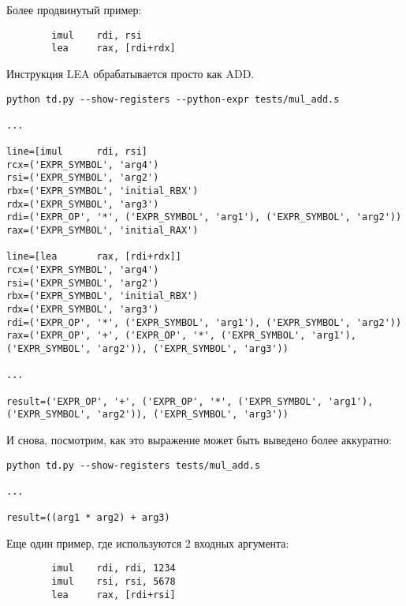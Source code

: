 Более продвинутый пример:

\begin{lstlisting}
        imul    rdi, rsi
        lea     rax, [rdi+rdx]
\end{lstlisting}

Инструкция LEA обрабатывается просто как ADD.

\begin{lstlisting}
python td.py --show-registers --python-expr tests/mul_add.s

...

line=[imul      rdi, rsi]
rcx=('EXPR_SYMBOL', 'arg4')
rsi=('EXPR_SYMBOL', 'arg2')
rbx=('EXPR_SYMBOL', 'initial_RBX')
rdx=('EXPR_SYMBOL', 'arg3')
rdi=('EXPR_OP', '*', ('EXPR_SYMBOL', 'arg1'), ('EXPR_SYMBOL', 'arg2'))
rax=('EXPR_SYMBOL', 'initial_RAX')

line=[lea       rax, [rdi+rdx]]
rcx=('EXPR_SYMBOL', 'arg4')
rsi=('EXPR_SYMBOL', 'arg2')
rbx=('EXPR_SYMBOL', 'initial_RBX')
rdx=('EXPR_SYMBOL', 'arg3')
rdi=('EXPR_OP', '*', ('EXPR_SYMBOL', 'arg1'), ('EXPR_SYMBOL', 'arg2'))
rax=('EXPR_OP', '+', ('EXPR_OP', '*', ('EXPR_SYMBOL', 'arg1'), ('EXPR_SYMBOL', 'arg2')), ('EXPR_SYMBOL', 'arg3'))

...

result=('EXPR_OP', '+', ('EXPR_OP', '*', ('EXPR_SYMBOL', 'arg1'), ('EXPR_SYMBOL', 'arg2')), ('EXPR_SYMBOL', 'arg3'))
\end{lstlisting}

И снова, посмотрим, как это выражение может быть выведено более аккуратно:

\begin{lstlisting}
python td.py --show-registers tests/mul_add.s

...

result=((arg1 * arg2) + arg3)
\end{lstlisting}

Еще один пример, где используются 2 входных аргумента:

\begin{lstlisting}
        imul    rdi, rdi, 1234
        imul    rsi, rsi, 5678
        lea     rax, [rdi+rsi]
\end{lstlisting}

